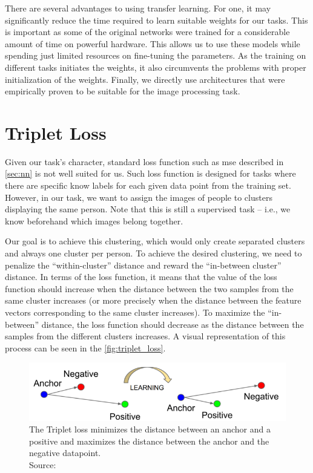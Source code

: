 There are several advantages to using transfer learning. For one, it may significantly reduce the time required to learn suitable weights for our tasks. This is important as some of the original networks were trained for a considerable amount of time on powerful hardware. This allows us to use these models while spending just limited resources on fine-tuning the parameters. As the training on different tasks initiates the weights, it also circumvents the problems with proper initialization of the weights. Finally, we directly use architectures that were empirically proven to be suitable for the image processing task.

\section{Triplet Loss}

\label{sec:triplet_loss}

Given our task's character, standard loss function such as \gls{mse} described in \autoref{sec:nn} is not well suited for us. Such loss function is designed for tasks where there are specific know labels for each given data point from the training set. However, in our task, we want to assign the images of people to clusters displaying the same person. Note that this is still a supervised task -- i.e., we know beforehand which images belong together.

Our goal is to achieve this clustering, which would only create separated clusters and always one cluster per person. To achieve the desired clustering, we need to penalize the ``within-cluster'' distance and reward the ``in-between cluster'' distance. In terms of the loss function, it means that the value of the loss function should increase when the distance between the two samples from the same cluster increases (or more precisely when the distance between the feature vectors corresponding to the same cluster increases). To maximize the ``in-between'' distance, the loss function should decrease as the distance between the samples from the different clusters increases. A visual representation of this process can be seen in the \autoref{fig:triplet_loss}.

\begin{figure}
    \centering
    \includegraphics[width=\textwidth]{img/triplet_loss.png}
    \caption[Triplet loss]{The Triplet loss minimizes the distance between an anchor and a positive and maximizes the distance between the anchor and the negative datapoint.\\
    Source: \cite{tripletlossnn}}
    \label{fig:triplet_loss}
\end{figure}

